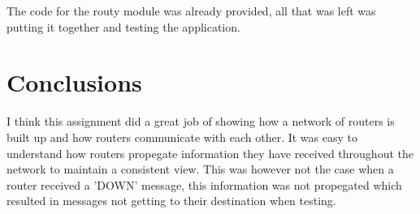 \documentclass[a4paper, 11pt]{article}
\begin{document}
The code for the routy module was already provided, all that was left was putting it together and testing the application.

\section{Conclusions}

I think this assignment did a great job of showing how a network of routers is built up and how routers communicate with each other. It was easy to understand how routers propegate information they have received throughout the network to maintain a consistent view. This was however not the case when a router received a 'DOWN' message, this information was not propegated which resulted in messages not getting to their destination when testing.
\end{document}
